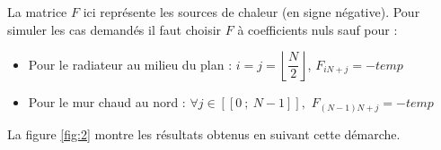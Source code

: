 \documentclass{article}
\begin{document}
La matrice $F$ ici repr\'esente les sources de chaleur (en signe n\'egative). Pour simuler les cas demand\'es il faut choisir $F$ \`a coefficients nuls sauf pour :
\begin{itemize}
\item Pour le radiateur au milieu du plan : $i = j = \left\lfloor\dfrac{N}{2}\right\rfloor$, $F_{iN +j}= -temp$
\item Pour le mur chaud au nord : $\forall j \in [\![ 0~;~ N-1 ]\!],$ $F_{(N-1)N + j}= -temp$
\end{itemize}

La figure \ref{fig:2} montre les r\'esultats obtenus en suivant cette d\'emarche.
\end{document}
